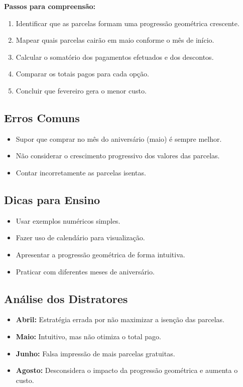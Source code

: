 \documentclass{article}
\begin{document}
\textbf{Passos para compreensão:}
\begin{enumerate}
  \item Identificar que as parcelas formam uma progressão geométrica crescente.
  \item Mapear quais parcelas cairão em maio conforme o mês de início.
  \item Calcular o somatório dos pagamentos efetuados e dos descontos.
  \item Comparar os totais pagos para cada opção.
  \item Concluir que fevereiro gera o menor custo.
\end{enumerate}

\subsection*{Erros Comuns}
\begin{itemize}
  \item Supor que comprar no mês do aniversário (maio) é sempre melhor.
  \item Não considerar o crescimento progressivo dos valores das parcelas.
  \item Contar incorretamente as parcelas isentas.
\end{itemize}

\subsection*{Dicas para Ensino}
\begin{itemize}
  \item Usar exemplos numéricos simples.
  \item Fazer uso de calendário para visualização.
  \item Apresentar a progressão geométrica de forma intuitiva.
  \item Praticar com diferentes meses de aniversário.
\end{itemize}

\subsection*{Análise dos Distratores}
\begin{itemize}
  \item \textbf{Abril:} Estratégia errada por não maximizar a isenção das parcelas.
  \item \textbf{Maio:} Intuitivo, mas não otimiza o total pago.
  \item \textbf{Junho:} Falsa impressão de mais parcelas gratuitas.
  \item \textbf{Agosto:} Desconsidera o impacto da progressão geométrica e aumenta o custo.
\end{itemize}
\end{document}
